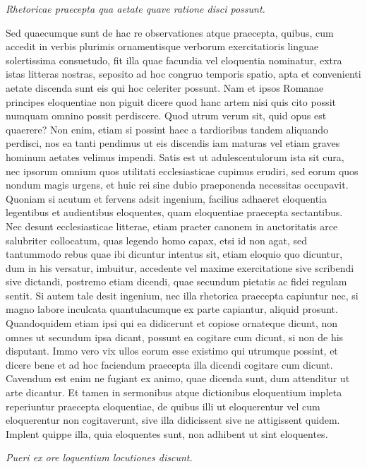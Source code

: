 \textit{Rhetoricae praecepta qua aetate quave ratione disci possunt.}

Sed quaecumque sunt de hac re observationes atque praecepta, quibus, cum accedit in verbis plurimis ornamentisque verborum exercitatioris linguae solertissima consuetudo, fit illa quae facundia vel eloquentia nominatur, extra istas litteras nostras, seposito ad hoc congruo temporis spatio, apta et convenienti aetate discenda sunt eis qui hoc celeriter possunt. Nam et ipsos Romanae principes eloquentiae non piguit dicere quod hanc artem nisi quis cito possit numquam omnino possit perdiscere. Quod utrum verum sit, quid opus est quaerere? Non enim, etiam si possint haec a tardioribus tandem aliquando perdisci, nos ea tanti pendimus ut eis discendis iam maturas vel etiam graves hominum aetates velimus impendi. Satis est ut adulescentulorum ista sit cura, nec ipsorum omnium quos utilitati ecclesiasticae cupimus erudiri, sed eorum quos nondum magis urgens, et huic rei sine dubio praeponenda necessitas occupavit. Quoniam si acutum et fervens adsit ingenium, facilius adhaeret eloquentia legentibus et audientibus eloquentes, quam eloquentiae praecepta sectantibus. Nec desunt ecclesiasticae litterae, etiam praeter canonem in auctoritatis arce salubriter collocatum, quas legendo homo capax, etsi id non agat, sed tantummodo rebus quae ibi dicuntur intentus sit, etiam eloquio quo dicuntur, dum in his versatur, imbuitur, accedente vel maxime exercitatione sive scribendi sive dictandi, postremo etiam dicendi, quae secundum pietatis ac fidei regulam sentit. Si autem tale desit ingenium, nec illa rhetorica praecepta capiuntur nec, si magno labore inculcata quantulacumque ex parte capiantur, aliquid prosunt. Quandoquidem etiam ipsi qui ea didicerunt et copiose ornateque dicunt, non omnes ut secundum ipsa dicant, possunt ea cogitare cum dicunt, si non de his disputant. Immo vero vix ullos eorum esse existimo qui utrumque possint, et dicere bene et ad hoc faciendum praecepta illa dicendi cogitare cum dicunt. Cavendum est enim ne fugiant ex animo, quae dicenda sunt, dum attenditur ut arte dicantur. Et tamen in sermonibus atque dictionibus eloquentium impleta reperiuntur praecepta eloquentiae, de quibus illi ut eloquerentur vel cum eloquerentur non cogitaverunt, sive illa didicissent sive ne attigissent quidem. Implent quippe illa, quia eloquentes sunt, non adhibent ut sint eloquentes.

\textit{Pueri ex ore loquentium locutiones discunt.}

